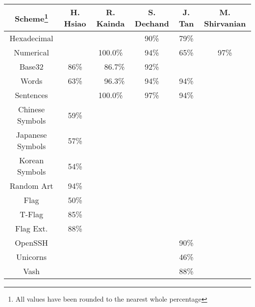 \begin{tabular}{c|ccccc}
    \toprule
    \textbf{Scheme\footnote{All values have been rounded to the nearest whole percentage}} 
    & \textbf{H. Hsiao}\cite{hsiao2009study}      
    & \textbf{R. Kainda}\cite{kainda2009usability}      
    & \textbf{S. Dechand}\cite{dechand2016empirical}
    & \textbf{J. Tan}\cite{tan2017can}      
    & \textbf{M. Shirvanian}\cite{shirvanian2017pitfalls}
    \\\hline
    Hexadecimal     &        &        & 90\% & 79\% &            \\
    Numerical       &        & 100.0\%  & 94\% & 65\% & 97\%       \\
    Base32          & 86\%   & ~~86.7\% & 92\% &      &            \\
    Words           & 63\%   & ~~96.3\% & 94\% & 94\% &            \\
    Sentences       &        & 100.0\%  & 97\% & 94\% &            \\
    Chinese Symbols & 59\%   &        &      &      &            \\
    Japanese Symbols& 57\%   &        &      &      &            \\
    Korean Symbols  & 54\%   &        &      &      &            \\
    \midrule
    Random Art	     & 94\%   &&&&\\
    Flag    	     & 50\%   &&&&\\
    T-Flag  	     & 85\%   &&&&\\
    Flag Ext.	     & 88\%   &&&&\\
    OpenSSH         &&&& 90\% &\\
    Unicorns         &&&& 46\% &\\
    Vash             &&&& 88\% &\\
    \bottomrule
\end{tabular}